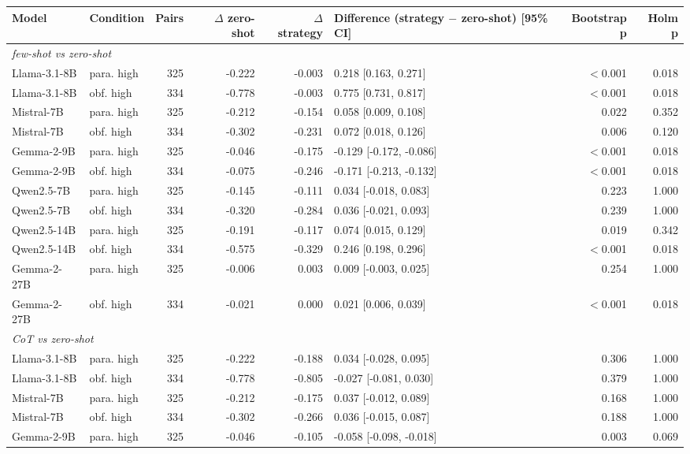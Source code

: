 \begin{tabular}{llrrrlrr}
\toprule
Model & Condition & Pairs & $\Delta$ zero-shot & $\Delta$ strategy & Difference (strategy $-$ zero-shot) [95\% CI] & Bootstrap p & Holm p \\
\midrule
\multicolumn{8}{l}{\textit{few-shot vs zero-shot}} \\
Llama-3.1-8B & para. high & 325 & -0.222 & -0.003 & 0.218 [0.163, 0.271] & $<$0.001 & 0.018 \\
Llama-3.1-8B & obf. high & 334 & -0.778 & -0.003 & 0.775 [0.731, 0.817] & $<$0.001 & 0.018 \\
Mistral-7B & para. high & 325 & -0.212 & -0.154 & 0.058 [0.009, 0.108] & 0.022 & 0.352 \\
Mistral-7B & obf. high & 334 & -0.302 & -0.231 & 0.072 [0.018, 0.126] & 0.006 & 0.120 \\
Gemma-2-9B & para. high & 325 & -0.046 & -0.175 & -0.129 [-0.172, -0.086] & $<$0.001 & 0.018 \\
Gemma-2-9B & obf. high & 334 & -0.075 & -0.246 & -0.171 [-0.213, -0.132] & $<$0.001 & 0.018 \\
Qwen2.5-7B & para. high & 325 & -0.145 & -0.111 & 0.034 [-0.018, 0.083] & 0.223 & 1.000 \\
Qwen2.5-7B & obf. high & 334 & -0.320 & -0.284 & 0.036 [-0.021, 0.093] & 0.239 & 1.000 \\
Qwen2.5-14B & para. high & 325 & -0.191 & -0.117 & 0.074 [0.015, 0.129] & 0.019 & 0.342 \\
Qwen2.5-14B & obf. high & 334 & -0.575 & -0.329 & 0.246 [0.198, 0.296] & $<$0.001 & 0.018 \\
Gemma-2-27B & para. high & 325 & -0.006 & 0.003 & 0.009 [-0.003, 0.025] & 0.254 & 1.000 \\
Gemma-2-27B & obf. high & 334 & -0.021 & 0.000 & 0.021 [0.006, 0.039] & $<$0.001 & 0.018 \\
\midrule
\multicolumn{8}{l}{\textit{CoT vs zero-shot}} \\
Llama-3.1-8B & para. high & 325 & -0.222 & -0.188 & 0.034 [-0.028, 0.095] & 0.306 & 1.000 \\
Llama-3.1-8B & obf. high & 334 & -0.778 & -0.805 & -0.027 [-0.081, 0.030] & 0.379 & 1.000 \\
Mistral-7B & para. high & 325 & -0.212 & -0.175 & 0.037 [-0.012, 0.089] & 0.168 & 1.000 \\
Mistral-7B & obf. high & 334 & -0.302 & -0.266 & 0.036 [-0.015, 0.087] & 0.188 & 1.000 \\
Gemma-2-9B & para. high & 325 & -0.046 & -0.105 & -0.058 [-0.098, -0.018] & 0.003 & 0.069 \\

\end{tabular}
